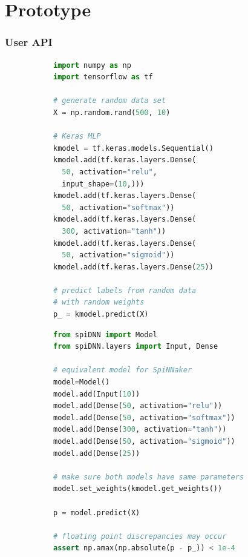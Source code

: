 \documentclass[xcolor=x11names,compress,usenames,dvipsnames,mathsans]{beamer}
\begin{document}
\section{Prototype}

\begin{frame}[fragile]
  \frametitle{User API}

  \begin{figure} %
  \begin{subfigure}[t]{.48\linewidth}
    {\tiny
  \begin{lstlisting}[language=Python]
import numpy as np
import tensorflow as tf

# generate random data set
X = np.random.rand(500, 10)

# Keras MLP
kmodel = tf.keras.models.Sequential()
kmodel.add(tf.keras.layers.Dense(
  50, activation="relu",
  input_shape=(10,)))
kmodel.add(tf.keras.layers.Dense(
  50, activation="softmax"))
kmodel.add(tf.keras.layers.Dense(
  300, activation="tanh"))
kmodel.add(tf.keras.layers.Dense(
  50, activation="sigmoid"))
kmodel.add(tf.keras.layers.Dense(25))

# predict labels from random data
# with random weights
p_ = kmodel.predict(X)
  \end{lstlisting}
}
  \end{subfigure}
  \begin{subfigure}[t]{.48\linewidth}
    {\tiny
  \begin{lstlisting}[language=Python]
from spiDNN import Model
from spiDNN.layers import Input, Dense

# equivalent model for SpiNNaker
model=Model()
model.add(Input(10))
model.add(Dense(50, activation="relu"))
model.add(Dense(50, activation="softmax"))
model.add(Dense(300, activation="tanh"))
model.add(Dense(50, activation="sigmoid"))
model.add(Dense(25))

# make sure both models have same parameters
model.set_weights(kmodel.get_weights())

p = model.predict(X)

# floating point discrepancies may occur
assert np.amax(np.absolute(p - p_)) < 1e-4
\end{lstlisting}
}
  \end{subfigure}
  \end{figure} %
\end{frame}
\end{document}
